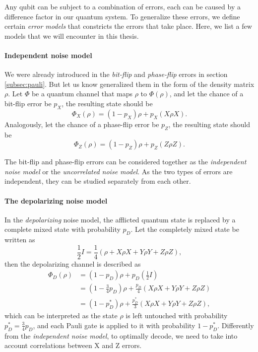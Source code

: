 Any qubit can be subject to a combination of errors, each can be caused by a difference factor in our quantum system. To generalize these errors, we define certain \emph{error models} that constricts the errors that take place. Here, we list a few models that we will encounter in this thesis. 

\paragraph{Independent noise model}
We were already introduced in the \emph{bit-flip} and \emph{phase-flip} errors in section \ref{subsec:pauli}. But let us know generalized them in the form of the density matrix $\rho$. Let $\Phi$ be a quantum channel that maps $\rho$ to $\Phi(\rho)$, and let the chance of a bit-flip error be $p_X$, the resulting state should be
\begin{equation}\label{qec:eq:bitflip}
  \Phi_X(\rho) = (1-p_X)\rho + p_X(X\rho X).
\end{equation}
Analogously, let the chance of a phase-flip error be $p_Z$, the resulting state should be
\begin{equation}\label{qec:eq:phaseflip}
  \Phi_Z(\rho) = (1-p_Z)\rho + p_Z(Z\rho Z).
\end{equation}

The bit-flip and phase-flip errors can be considered together as the \emph{independent noise model} or the \emph{uncorrelated noise model}. As the two types of errors are independent, they can be studied separately from each other.

\paragraph{The depolarizing noise model}
In the \emph{depolarizing} noise model, the afflicted quantum state is replaced by a complete mixed state with probability $p_D$. Let the completely mixed state be written as
\begin{equation*}\label{qec:eq:mixstate}
  \frac{1}{2}I = \frac{1}{4}(\rho + X\rho X + Y\rho Y + Z\rho Z),
\end{equation*}
then the depolarizing channel is described as
\begin{align}\label{qec:eq:depolarizing}
  \nonumber \Phi_D(\rho) &= (1-p_D)\rho + p_D\left(\frac{1}{2}I\right) \\
  \nonumber &= \left(1-\frac{3}{4}p_D\right)\rho + \frac{p_D}{4}(X\rho X + Y\rho Y + Z\rho Z) \\
  &= (1-p^*_D)\rho + \frac{p^*_D}{3}(X\rho X + Y\rho Y + Z\rho Z),
\end{align}
which can be interpreted as the state $\rho$ is left untouched with probability $p^*_D =\frac{3}{4}p_D$, and each Pauli gate is applied to it with probability $1-p^*_D$. Differently from the \emph{independent noise model}, to optimally decode, we need to take into account correlations between X and Z errors.

